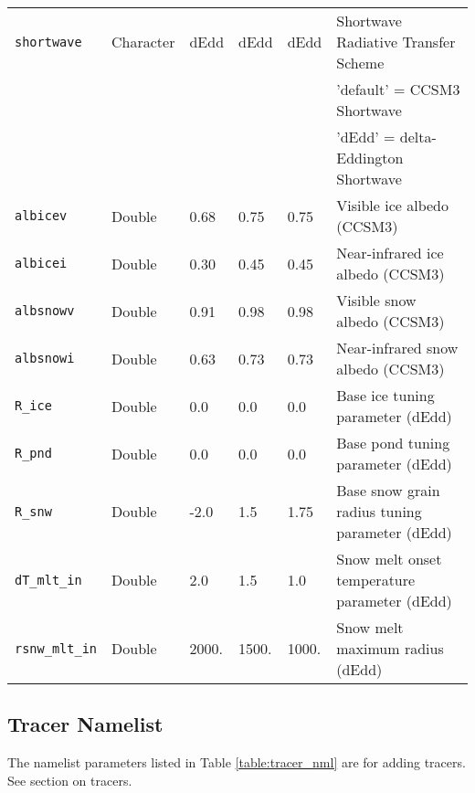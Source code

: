 \begin{table}[hb]
\begin{center}
\begin{tabular}{p{3cm}p{2cm}p{3cm}p{3cm}p{3cm}p{6.5cm}}
{\tt shortwave} & Character & dEdd & dEdd & dEdd & Shortwave Radiative Transfer Scheme \\
                &           &      &      &      & 'default' = CCSM3 Shortwave \\
                &           &      &      &      & 'dEdd' = delta-Eddington Shortwave \\

{\tt albicev} &  Double & 0.68 & 0.75 & 0.75 & Visible ice albedo (CCSM3)\\

{\tt albicei} &  Double & 0.30 & 0.45 & 0.45 & Near-infrared ice albedo (CCSM3)\\

{\tt albsnowv} & Double & 0.91 & 0.98 & 0.98 & Visible snow albedo (CCSM3)\\

{\tt albsnowi} & Double & 0.63 & 0.73 & 0.73 & Near-infrared snow albedo (CCSM3)\\

{\tt R\_ice} & Double & 0.0 & 0.0 & 0.0 & Base ice tuning parameter (dEdd)\\

{\tt R\_pnd} & Double & 0.0 & 0.0 & 0.0 & Base pond tuning parameter (dEdd)\\

{\tt R\_snw} & Double & -2.0 & 1.5 & 1.75 & Base snow grain radius tuning parameter (dEdd)\\

{\tt dT\_mlt\_in} & Double & 2.0 & 1.5 & 1.0 & Snow melt onset temperature parameter (dEdd)\\

{\tt rsnw\_mlt\_in} & Double & 2000. & 1500. & 1000. & Snow melt maximum radius (dEdd)\\

  \hline
  \end{tabular}
  \end{center}
\end{table}
\subsection{Tracer Namelist}

The namelist parameters listed in Table \ref{table:tracer_nml} are for
adding tracers. See section on tracers.

